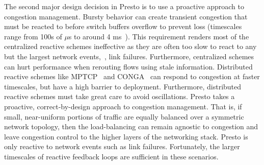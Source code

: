  The second major design decision in 
Presto is to use a proactive approach to congestion management. Bursty 
behavior can create transient congestion that must be reacted to 
before switch buffers overflow to prevent loss (timescales range from 100s of $\mu$s 
to around 4 ms~\cite{planck}). This requirement renders most of the centralized reactive schemes ineffective
as they are often too slow to react to any but the largest network events,~\eg{}, link failures. 
Furthermore, centralized schemes can hurt performance when rerouting
flows using stale information.
Distributed reactive schemes like MPTCP~\cite{mptcp} and 
CONGA~\cite{conga} can respond to congestion at faster timescales, but have a high barrier to deployment.
Furthermore, distributed reactive schemes must take great care to avoid oscillations.
Presto takes a proactive, correct-by-design approach to congestion management. 
That is, if small, near-uniform portions of traffic are equally
balanced over a symmetric network topology, then the load-balancing can remain agnostic to congestion and
leave congestion control to the higher layers of the networking stack.
Presto is only reactive to network events such as link failures. Fortunately, 
the larger timescales of reactive feedback loops are sufficient in these scenarios. 

